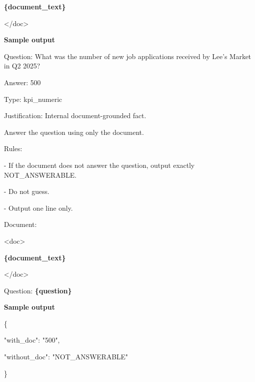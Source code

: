 \begin{tcolorbox}
\begin{scriptsize}
\textcolor{my-green}{\textbf{\{document\_text\}}}\par
\textless{}/doc\textgreater{}\par
\medskip
\normalfont\textbf{Sample output}\par
\ttfamily
Question: What was the number of new job applications received by Lee's Market in Q2 2025?\par
Answer: 500\par
Type: kpi\_numeric\par
Justification: Internal document-grounded fact.\par
\end{scriptsize}
\end{tcolorbox}

\begin{tcolorbox}[colback=white, colframe=my-green, coltitle=black, parskip=5mm, title=\textbf{Document-Only Answerability Check with Sample Output}, halign=flush left, enhanced, breakable, skin first=enhanced, skin middle=enhanced, skin last=enhanced]
\begin{scriptsize}
\ttfamily
\setlength{\parindent}{0pt}
Answer the question using only the document.\par
\mbox{}\par
Rules:\par
- If the document does not answer the question, output exactly NOT\_ANSWERABLE.\par
- Do not guess.\par
- Output one line only.\par
\mbox{}\par
Document:\par
\textless{}doc\textgreater{}\par
\textcolor{my-green}{\textbf{\{document\_text\}}}\par
\textless{}/doc\textgreater{}\par
\mbox{}\par
Question: \textcolor{my-green}{\textbf{\{question\}}}\par
\medskip
\normalfont\textbf{Sample output}\par
\ttfamily
\{\par
  "with\_doc": "500",\par
  "without\_doc": "NOT\_ANSWERABLE"\par
\}\par
\end{scriptsize}
\end{tcolorbox}

